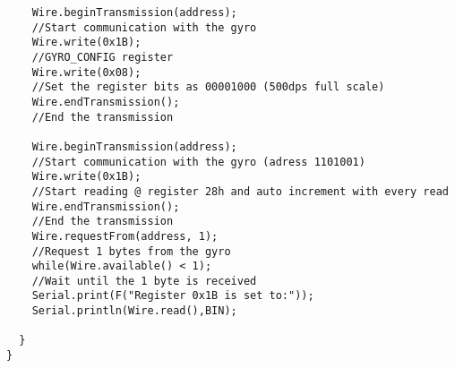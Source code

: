 \begin{lstlisting}
    Wire.beginTransmission(address);                             
    //Start communication with the gyro
    Wire.write(0x1B);                                            
    //GYRO_CONFIG register
    Wire.write(0x08);                                            
    //Set the register bits as 00001000 (500dps full scale)
    Wire.endTransmission();                                      
    //End the transmission
    
    Wire.beginTransmission(address);                             
    //Start communication with the gyro (adress 1101001)
    Wire.write(0x1B);                                            
    //Start reading @ register 28h and auto increment with every read
    Wire.endTransmission();                                      
    //End the transmission
    Wire.requestFrom(address, 1);                                
    //Request 1 bytes from the gyro
    while(Wire.available() < 1);                                 
    //Wait until the 1 byte is received
    Serial.print(F("Register 0x1B is set to:"));
    Serial.println(Wire.read(),BIN);

  }
}


\end{lstlisting}
